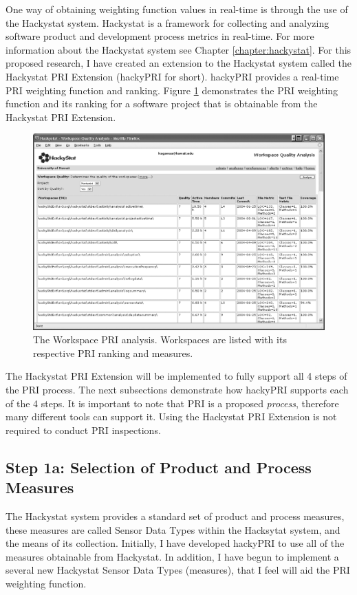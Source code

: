 One way of obtaining weighting function values in real-time is through the
use of the Hackystat system. Hackystat is a framework for collecting and
analyzing software product and development process metrics in real-time.
For more information about the Hackystat system see Chapter
\ref{chapter:hackystat}.  For this proposed research, I have created an
extension to the Hackystat system called the Hackystat PRI Extension
(hackyPRI for short). hackyPRI provides a real-time PRI weighting function
and ranking. Figure \ref{fig:intro-WorkspacePRIAnalysis} demonstrates the
PRI weighting function and its ranking for a software project that is
obtainable from the Hackystat PRI Extension.

\begin{figure}[ht]
  \centering
  \includegraphics[width=1.00\textwidth]{WorkspaceQuality.eps}
  \caption{The Workspace PRI analysis. Workspaces are listed with its
  respective PRI ranking and measures.}
  \label{fig:intro-WorkspacePRIAnalysis}
\end{figure}

The Hackystat PRI Extension will be implemented to fully support all 4
steps of the PRI process. The next subsections demonstrate how hackyPRI
supports each of the 4 steps. It is important to note that PRI is a
proposed \textit{process}, therefore many different tools can support it.
Using the Hackystat PRI Extension is not required to conduct PRI
inspections.



\subsection{Step 1a: Selection of Product and Process Measures}
The Hackystat system provides a standard set of product and process
measures, these measures are called Sensor Data Types within the Hacksytat
system, and the means of its collection. Initially, I have developed
hackyPRI to use all of the measures obtainable from Hackystat. In addition,
I have begun to implement a several new Hackystat Sensor Data Types
(measures), that I feel will aid the PRI weighting function.

